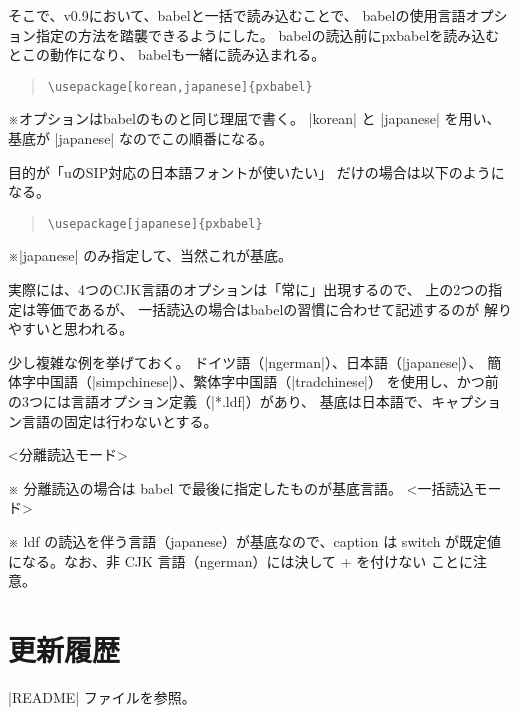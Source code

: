 \documentclass[a4paper,uplatex]{jsarticle}
\newcommand{\Pkg}[1]{\textsf{#1}}
\newcommand{\Note}{\par\noindent ※}
\providecommand{\upTeX}{u\pTeX}
\begin{document}
そこで、v0.9において、\Pkg{babel}と一括で読み込むことで、
\Pkg{babel}の使用言語オプション指定の方法を踏襲できるようにした。
\Pkg{babel}の読込前に\Pkg{pxbabel}を読み込むとこの動作になり、
\Pkg{babel}も一緒に読み込まれる。

\begin{quote}\begin{verbatim}
\usepackage[korean,japanese]{pxbabel}
\end{verbatim}\end{quote}
\Note オプションは\Pkg{babel}のものと同じ理屈で書く。
|korean| と |japanese| を用い、
基底が |japanese| なのでこの順番になる。

目的が「{\upTeX}のSIP対応の日本語フォントが使いたい」
だけの場合は以下のようになる。

\begin{quote}\begin{verbatim}
\usepackage[japanese]{pxbabel}
\end{verbatim}\end{quote}
\Note |japanese| のみ指定して、当然これが基底。

実際には、4つのCJK言語のオプションは「常に」出現するので、
上の2つの指定は等価であるが、
一括読込の場合は\Pkg{babel}の習慣に合わせて記述するのが
解りやすいと思われる。

少し複雑な例を挙げておく。
ドイツ語（|ngerman|）、日本語（|japanese|）、
簡体字中国語（|simpchinese|）、繁体字中国語（|tradchinese|）
を使用し、かつ前の3つには言語オプション定義（|*.ldf|）があり、
基底は日本語で、キャプション言語の固定は行わないとする。

<分離読込モード>
\usepackage[ngerman,simpchinese,japanese]{babel}
\usepackage[schinese=simpchinese,tchinese=tradchinese,
            caption=switch]{pxbabel}
※ 分離読込の場合は babel で最後に指定したものが基底言語。
<一括読込モード>
\usepackage[ngerman,schinese=+simpchinese,tchinese=tradchinese,
            +japanese]{pxbabel}
※ ldf の読込を伴う言語（japanese）が基底なので、caption は switch
が既定値になる。なお、非 CJK 言語（ngerman）には決して + を付けない
ことに注意。

\section{更新履歴}

|README| ファイルを参照。

\end{document}

